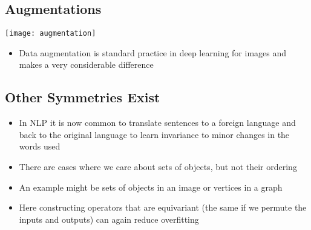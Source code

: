 
\begin{slide}
\section{Augmentations}

\begin{center}
  \texttt{[image: augmentation]}\pause
\end{center}
\begin{PauseHighLight}
  \begin{itemize}
  \item Data augmentation is standard practice in deep learning for
    images\pause{} and makes a very considerable difference\pauseb
  \end{itemize}
\end{PauseHighLight}

\end{slide}


\begin{slide}
\section{Other Symmetries Exist}

\begin{PauseHighLight}
  \begin{itemize}
    \item In NLP it is now common to translate sentences to a foreign
      language and back to the original language to learn invariance
      to minor changes in the words used\pause
    \item There are cases where we care about sets of objects, but not
      their ordering\pause
    \item An example might be sets of objects in an image or vertices
      in a graph\pause
    \item Here constructing operators that are equivariant (the same
      if we permute the inputs and outputs) can again reduce overfitting\pause
  \end{itemize}
\end{PauseHighLight}

\end{slide}


